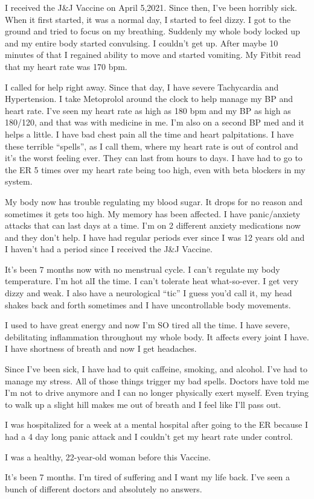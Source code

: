 I received the J\&J Vaccine on April 5,2021. Since then, I’ve been horribly
sick. When it first started, it was a normal day, I started to feel dizzy. I got
to the ground and tried to focus on my breathing. Suddenly my whole body locked
up and my entire body started convulsing. I couldn’t get up. After maybe 10
minutes of that I regained ability to move and started vomiting. My Fitbit read
that my heart rate was 170 bpm.

I called for help right away. Since that day, I have severe Tachycardia and
Hypertension. I take Metoprolol around the clock to help manage my BP and heart
rate. I’ve seen my heart rate as high as 180 bpm and my BP as high as 180/120,
and that was with medicine in me. I’m also on a second BP med and it helps a
little. I have bad chest pain all the time and heart palpitations. I have these
terrible “spells”, as I call them, where my heart rate is out of control and
it’s the worst feeling ever. They can last from hours to days. I have had to go
to the ER 5 times over my heart rate being too high, even with beta blockers in
my system.

My body now has trouble regulating my blood sugar. It drops for no reason and
sometimes it gets too high. My memory has been affected. I have panic/anxiety
attacks that can last days at a time. I’m on 2 different anxiety medications now
and they don’t help. I have had regular periods ever since I was 12 years old
and I haven’t had a period since I received the J\&J Vaccine.

It’s been 7 months now with no menstrual cycle. I can’t regulate my body
temperature. I’m hot alI the time. I can’t tolerate heat what-so-ever. I get
very dizzy and weak. I also have a neurological “tic” I guess you’d call it, my
head shakes back and forth sometimes and I have uncontrollable body movements.

I used to have great energy and now I’m SO tired all the time. I have severe,
debilitating inflammation throughout my whole body. It affects every joint I
have. I have shortness of breath and now I get headaches.

Since I’ve been sick, I have had to quit caffeine, smoking, and alcohol. I’ve
had to manage my stress. All of those things trigger my bad spells. Doctors have
told me I’m not to drive anymore and I can no longer physically exert
myself. Even trying to walk up a slight hill makes me out of breath and I feel
like I’ll pass out.

I was hospitalized for a week at a mental hospital after going to the ER because
I had a 4 day long panic attack and I couldn’t get my heart rate under control.

I was a healthy, 22-year-old woman before this Vaccine.

It’s been 7 months. I’m tired of suffering and I want my life back. I’ve seen a
bunch of different doctors and absolutely no answers.
